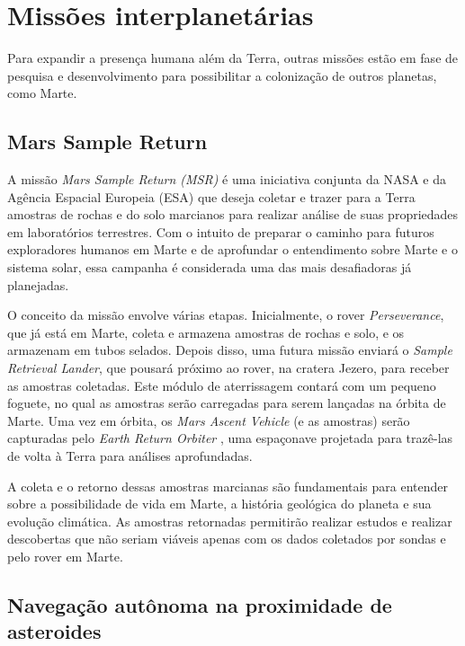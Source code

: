 \section{Missões interplanetárias}

Para expandir a presença humana além da Terra, outras missões estão em fase de pesquisa e desenvolvimento para possibilitar a colonização de outros planetas, como Marte.

\subsection{Mars Sample Return}

A missão \emph{Mars Sample Return (MSR)} \cite{nasa_mars_sample_return_2025} é uma iniciativa conjunta da NASA e da Agência Espacial Europeia (ESA) que deseja coletar e trazer para a Terra amostras de rochas e do solo marcianos para realizar análise de suas propriedades em laboratórios terrestres.
Com o intuito de preparar o caminho para futuros exploradores humanos em Marte e de aprofundar o entendimento sobre Marte e o sistema solar, essa campanha é considerada uma das mais desafiadoras já planejadas.

O conceito da missão envolve várias etapas.
Inicialmente, o rover \emph{Perseverance}, que já está em Marte, coleta e armazena amostras de rochas e solo, e os armazenam em tubos selados.
Depois disso, uma futura missão enviará o \emph{Sample Retrieval Lander}, que pousará próximo ao rover, na cratera Jezero, para receber as amostras coletadas. 
Este módulo de aterrissagem contará com um pequeno foguete, no qual as amostras serão carregadas para serem lançadas na órbita de Marte.
Uma vez em órbita, os \emph{Mars Ascent Vehicle} (e as amostras) serão capturadas pelo \emph{Earth Return Orbiter} \cite{nasa_earth_return_orbiter_2025}, uma espaçonave projetada para trazê-las de volta à Terra para análises aprofundadas.

A coleta e o retorno dessas amostras marcianas são fundamentais para entender sobre a possibilidade de vida em Marte, a história geológica do planeta e sua evolução climática.
As amostras retornadas permitirão realizar estudos e realizar descobertas que não seriam viáveis apenas com os dados coletados por sondas e pelo rover em Marte.

\subsection{Navegação autônoma na proximidade de asteroides}

